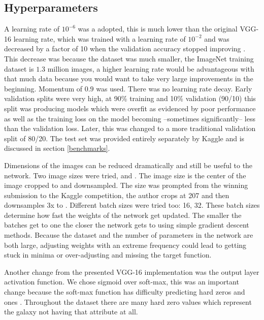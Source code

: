 \subsection{Hyperparameters}

A learning rate of $10^{{-6}}$ was a adopted, this is much lower than the original VGG-16 learning rate, which was trained with a learning rate of $10^{{-2}}$ and was decreased by a factor of 10 when the validation accuracy stopped improving \cite{vgg16-arxiv}. This decrease was because the dataset was much smaller, the ImageNet training dataset is $1.3$ million images, a higher learning rate would be advantageous with that much data because you would want to take very large improvements in the beginning. Momentum of $0.9$ was used. There was no learning rate decay. Early validation splits were very high, at 90\% training and 10\% validation (90/10) this split was producing models which were overfit as evidenced by poor performance as well as the training loss on the model becoming --sometimes significantly-- less than the validation loss. Later, this was changed to a more traditional validation split of 80/20. The test set was provided entirely separately by Kaggle and is discussed in section \ref{benchmarks}.

Dimensions of the images can be reduced dramatically and still be useful to the network. Two image sizes were tried,  and . The  image size is the center of the image cropped to  and downsampled. The  size was prompted from the winning submission to the Kaggle competition, the author crops at 207 and then downsamples 3x to  \cite{kaggle-winner}. Different batch sizes were tried too: 16, 32. These batch sizes determine how fast the weights of the network get updated. The smaller the batches get to one the closer the network gets to using simple gradient descent methods. Because the dataset and the number of parameters in the network are both large, adjusting weights with an extreme frequency could lead to getting stuck in minima or over-adjusting and missing the target function.

Another change from the presented VGG-16 implementation was the output layer activation function. We chose sigmoid over soft-max, this was an important change because the soft-max function has difficulty predicting hard zeros and ones \cite{kaggle-winner}. Throughout the dataset there are many hard zero values which represent the galaxy not having that attribute at all.

